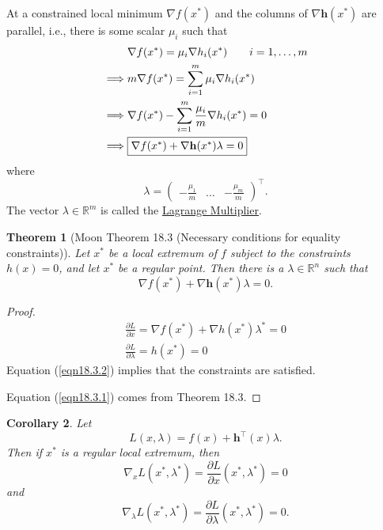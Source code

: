\documentclass{article}
\newtheorem{theorem}{Theorem}[section]
\newtheorem{corollary}[theorem]{Corollary}
\newcommand{\hbf}{\mathbf{h}}
\begin{document}
\par{}
	At a constrained local minimum $\nabla f(x^{\ast})$ and the columns of $\nabla \hbf(x^{\ast})$ are parallel, i.e., there is some scalar $\mu_i$ such that
	\begin{align*}
		& \nabla f(x^{\ast}) = \mu_i\nabla h_i(x^{\ast}) \qquad i= 1,\ldots,m \\
		\implies & m\nabla f(x^{\ast}) = \sum_{i=1}^m \mu_i \nabla h_i (x^{\ast}) \\
		\implies & \nabla f(x^{\ast}) - \sum_{i=1}^m \frac{\mu_i}{m}\nabla h_i(x^{\ast}) = 0\\
		\implies & \fbox{$\nabla f(x^{\ast}) + \nabla \hbf(x^{\ast}) \lambda = 0$}
	\end{align*}
	where 
	\[
		\lambda = \begin{pmatrix}
	    			-\frac{\mu_1}{m} &
	    			\dots &
	    			-\frac{\mu_m}{m}
	  			  \end{pmatrix}^\top.
	\]
	The vector $\lambda \in \mathbb{R}^m$ is called the \underline{Lagrange Multiplier}.	

	\begin{theorem}[Moon Theorem 18.3 (Necessary conditions for equality constraints)]
		Let $x^{\ast}$ be a local extremum of $f$ subject to the constraints $h(x) = 0$, and let $x^{\ast}$ be a regular point.  Then there is a $\lambda \in \mathbb{R}^n$ such that
		\[ 
			\nabla f(x^{\ast}) + \nabla \hbf(x^{\ast})\lambda = 0.
		\]
	\end{theorem}	
	\begin{proof}
		\begin{eqnarray}
		\label{eqn18.3.1} \frac{\partial L}{\partial x} = \nabla f(x^{\ast}) + \nabla h(x^{\ast}) \lambda^{\ast} = 0 \\
		\label{eqn18.3.2} \frac{\partial L}{\partial \lambda} = h(x^{\ast}) = 0
		\end{eqnarray}
		Equation (\ref{eqn18.3.2}) implies that the constraints are satisfied.
		
		Equation (\ref{eqn18.3.1}) comes from Theorem 18.3.
	\end{proof}

	\begin{corollary}
		Let 
		\[ 
			L(x,\lambda) = f(x) + \hbf^\top(x)\lambda.
		\]
		Then if $x^{\ast}$ is a regular local extremum, then
		\[ 
			\nabla_x L(x^{\ast},\lambda^{\ast}) = \frac{\partial L}{\partial x}(x^{\ast},\lambda^{\ast}) = 0 
		\]
		and
		\[ 
			\nabla_{\lambda}L(x^{\ast},\lambda^{\ast}) = \frac{\partial L}{\partial \lambda}(x^{\ast},\lambda^{\ast}) = 0.
		\]
	\end{corollary}
\end{document}
